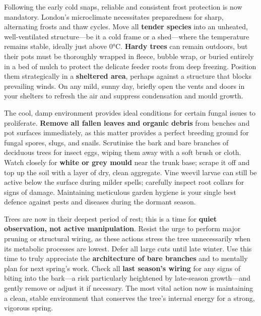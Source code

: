 \medskip
{}
\noindent
Following the early cold snaps, reliable and consistent frost protection is now mandatory. 
London's microclimate necessitates preparedness for sharp, alternating frosts and thaw cycles. 
Move all \textbf{tender species} into an unheated, well\--ventilated structure---be it a cold frame or a shed---where the temperature remains stable, ideally just above 0°C. 
\textbf{Hardy trees} can remain outdoors, but their pots must be thoroughly wrapped in fleece, bubble wrap, or buried entirely in a bed of mulch to protect the delicate feeder roots from deep freezing. 
Position them strategically in a \textbf{sheltered area}, perhaps against a structure that blocks prevailing winds. 
On any mild, sunny day, briefly open the vents and doors in your shelters to refresh the air and suppress condensation and mould growth.

\medskip
{}
\noindent
The cool, damp environment provides ideal conditions for certain fungal issues to proliferate. 
\textbf{Remove all fallen leaves and organic debris} from benches and pot surfaces immediately, as this matter provides a perfect breeding ground for fungal spores, slugs, and snails. 
Scrutinise the bark and bare branches of deciduous trees for insect eggs, wiping them away with a soft brush or cloth. 
Watch closely for \textbf{white or grey mould} near the trunk base; scrape it off and top up the soil with a layer of dry, clean aggregate. 
Vine weevil larvae can still be active below the surface during milder spells; carefully inspect root collars for signs of damage. 
Maintaining meticulous garden hygiene is your single best defence against pests and diseases during the dormant season.

\medskip
{}
\noindent
Trees are now in their deepest period of rest; this is a time for \textbf{quiet observation, not active manipulation}. 
Resist the urge to perform major pruning or structural wiring, as these actions stress the tree unnecessarily when its metabolic processes are lowest. 
Defer all large cuts until late winter. 
Use this time to truly appreciate the \textbf{architecture of bare branches} and to mentally plan for next spring's work. 
Check all \textbf{last season's wiring} for any signs of biting into the bark---a risk particularly heightened by late\--season growth---and gently remove or adjust it if necessary. 
The most vital action now is maintaining a clean, stable environment that conserves the tree's internal energy for a strong, vigorous spring.


